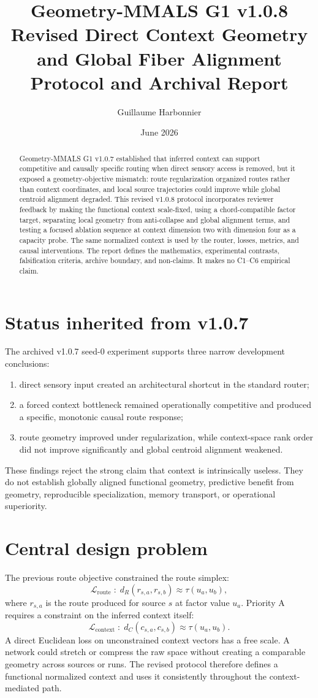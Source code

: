 \documentclass[11pt]{article}
\title{Geometry-MMALS G1 v1.0.8\\
Revised Direct Context Geometry and Global Fiber Alignment\\
Protocol and Archival Report}
\author{Guillaume Harbonnier}
\date{June 2026}
\newcommand{\Lc}{\mathcal{L}_{\mathrm{context}}}
\newcommand{\Lroute}{\mathcal{L}_{\mathrm{route}}}
\begin{document}
\maketitle

\begin{abstract}
Geometry-MMALS G1 v1.0.7 established that inferred context can support competitive and causally specific routing when direct sensory access is removed, but it exposed a geometry-objective mismatch: route regularization organized routes rather than context coordinates, and local source trajectories could improve while global centroid alignment degraded. This revised v1.0.8 protocol incorporates reviewer feedback by making the functional context scale-fixed, using a chord-compatible factor target, separating local geometry from anti-collapse and global alignment terms, and testing a focused ablation sequence at context dimension two with dimension four as a capacity probe. The same normalized context is used by the router, losses, metrics, and causal interventions. The report defines the mathematics, experimental contrasts, falsification criteria, archive boundary, and non-claims. It makes no C1--C6 empirical claim.
\end{abstract}

\section{Status inherited from v1.0.7}
The archived v1.0.7 seed-0 experiment supports three narrow development conclusions:
\begin{enumerate}
    \item direct sensory input created an architectural shortcut in the standard router;
    \item a forced context bottleneck remained operationally competitive and produced a specific, monotonic causal route response;
    \item route geometry improved under regularization, while context-space rank order did not improve significantly and global centroid alignment weakened.
\end{enumerate}
These findings reject the strong claim that context is intrinsically useless. They do not establish globally aligned functional geometry, predictive benefit from geometry, reproducible specialization, memory transport, or operational superiority.

\section{Central design problem}
The previous route objective constrained the route simplex:
\[
\Lroute \;:\; d_R(r_{s,a},r_{s,b}) \approx \tau(u_a,u_b),
\]
where $r_{s,a}$ is the route produced for source $s$ at factor value $u_a$. Priority A requires a constraint on the inferred context itself:
\[
\Lc \;:\; d_C(c_{s,a},c_{s,b}) \approx \tau(u_a,u_b).
\]
A direct Euclidean loss on unconstrained context vectors has a free scale. A network could stretch or compress the raw space without creating a comparable geometry across sources or runs. The revised protocol therefore defines a functional normalized context and uses it consistently throughout the context-mediated path.
\end{document}

